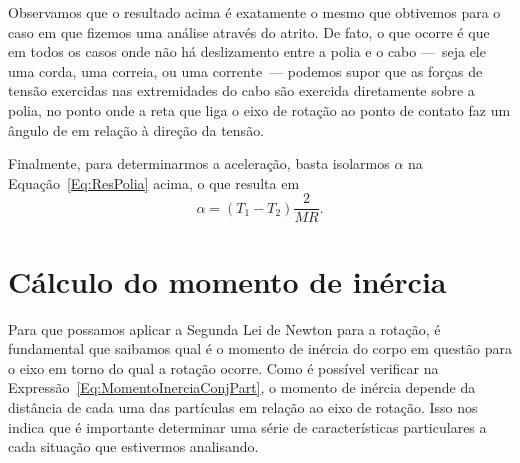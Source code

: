 Observamos que o resultado acima é exatamente o mesmo que obtivemos para o caso em que fizemos uma análise através do atrito. De fato, o que ocorre é que em todos os casos onde não há deslizamento entre a polia e o cabo ---~seja ele uma corda, uma correia, ou uma corrente~--- podemos supor que as forças de tensão exercidas nas extremidades do cabo são exercida diretamente sobre a polia, no ponto onde a reta que liga o eixo de rotação ao ponto de contato faz um ângulo de  em relação à direção da tensão.

Finalmente, para determinarmos a aceleração, basta isolarmos $\alpha$ na  Equação~\eqref{Eq:ResPolia} acima, o que resulta em
\begin{equation}
    \alpha = (T_1 - T_2) \frac{2}{MR}.
\end{equation}

\section{Cálculo do momento de inércia}

Para que possamos aplicar a Segunda Lei de Newton para a rotação, é fundamental que saibamos qual é o momento de inércia do corpo em questão para o eixo em torno do qual a rotação ocorre. Como é possível verificar na Expressão~\ref{Eq:MomentoInerciaConjPart}, o momento de inércia depende da distância de cada uma das partículas em relação ao eixo de rotação. Isso nos indica que é importante determinar uma série de características particulares a cada situação que estivermos analisando.

